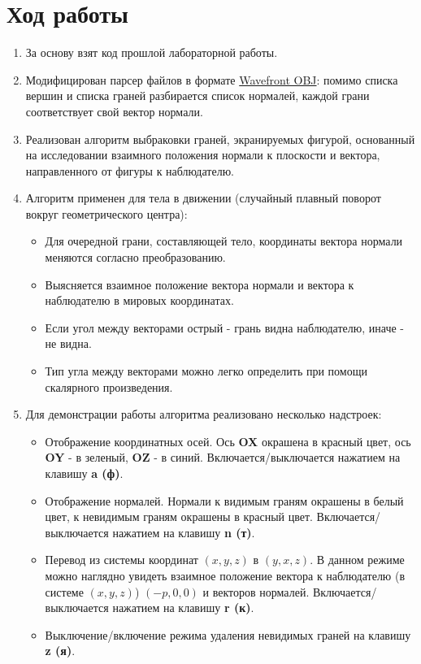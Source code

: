 \documentclass[a4paper,12pt]{article}
\begin{document}
\section{\normalsize{Ход работы}}
\begin{flushleft}
  \begin{enumerate}
    \item За основу взят код прошлой лабораторной работы.
    \item Модифицирован парсер файлов в формате \href{https://ru.wikipedia.org/wiki/Obj}{Wavefront OBJ}: помимо списка вершин и списка граней разбирается список нормалей, каждой грани соответствует свой вектор нормали.
    \item Реализован алгоритм выбраковки граней, экранируемых фигурой, основанный на исследовании взаимного положения нормали к плоскости и вектора, направленного от фигуры к наблюдателю.
    \item Алгоритм применен для тела в движении (случайный плавный поворот вокруг геометрического центра):
      \linebreak
      \begin{itemize}
        \item Для очередной грани, составляющей тело, координаты вектора нормали меняются согласно преобразованию.
        \item Выясняется взаимное положение вектора нормали и вектора к наблюдателю в мировых координатах.
        \item Если угол между векторами острый - грань видна наблюдателю, иначе - не видна.
        \item Тип угла между векторами можно легко определить при помощи скалярного произведения.
      \end{itemize}
    \item Для демонстрации работы алгоритма реализовано несколько надстроек:
      \linebreak
      \begin{itemize}
        \item Отображение координатных осей. Ось \textbf{OX} окрашена в {\color{red} красный} цвет, ось \textbf{OY} - в {\color{green} зеленый}, \textbf{OZ} - в {\color{blue} синий}. Включается/выключается нажатием на клавишу \textbf{a (ф)}.
        \item Отображение нормалей. Нормали к видимым граням окрашены в белый цвет, к невидимым граням окрашены в красный цвет. Включается/выключается нажатием на клавишу \textbf{n (т)}.
        \item Перевод из системы координат \((x,y,z)\) в \((y,x,z)\). В данном режиме можно наглядно увидеть взаимное положение вектора к наблюдателю (в системе \((x,y,z)\)) \((-p, 0, 0)\) и векторов нормалей. Включается/выключается нажатием на клавишу \textbf{r (к)}.
        \item Выключение/включение режима удаления невидимых граней на клавишу \textbf{z (я)}.
      \end{itemize}
  \end{enumerate}
\end{flushleft}
\end{document}
